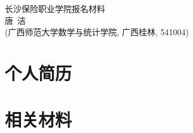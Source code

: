 \documentclass[UFT8]{ctexart}%
\begin{document}
\thispagestyle{empty} %
\vspace*{3cm}
\begin{center}
{{\LARGE\heiti 长沙保险职业学院报名材料}\\[0.6cm]
{\normalsize 唐\ 洁}\\[0.1cm]
{\small(广西师范大学数学与统计学院, 广西桂林, 541004)}}
\end{center}

\clearpage%
\tableofcontents%
\thispagestyle{empty} %

\clearpage%
\setcounter{page}{1}%

%
%
%
%
%
%

\section{个人简历}
%


\section{相关材料}
\end{document}

